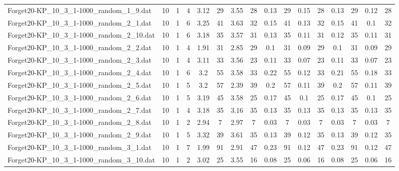 \begin{sidewaystable}[!ht]
{\begin{tabular}{lccccccccccccccc}
Forget20-KP\_10\_3\_1-1000\_random\_1\_9.dat & 10 & 1 & 4 & 3.12 & 29 & 3.55 & 28 & 0.13 & 29 & 0.15 & 28 & 0.13 & 29 &  \textcolor{blue2}{0.12} & 28 \\
Forget20-KP\_10\_3\_1-1000\_random\_2\_1.dat & 10 & 1 & 6 & 3.25 & 41 & 3.63 & 32 & 0.15 & 41 & 0.13 & 32 & 0.15 & 41 &  \textcolor{blue2}{0.1} & 32 \\
Forget20-KP\_10\_3\_1-1000\_random\_2\_10.dat & 10 & 1 & 6 & 3.18 & 35 & 3.57 & 31 & 0.13 & 35 &  \textcolor{blue2}{0.11} & 31 & 0.12 & 35 &  \textcolor{blue2}{0.11} & 31 \\
Forget20-KP\_10\_3\_1-1000\_random\_2\_2.dat & 10 & 1 & 4 & 1.91 & 31 & 2.85 & 29 & 0.1 & 31 &  \textcolor{blue2}{0.09} & 29 & 0.1 & 31 &  \textcolor{blue2}{0.09} & 29 \\
Forget20-KP\_10\_3\_1-1000\_random\_2\_3.dat & 10 & 1 & 4 & 3.11 & 33 & 3.56 & 23 & 0.11 & 33 &  \textcolor{blue2}{0.07} & 23 & 0.11 & 33 &  \textcolor{blue2}{0.07} & 23 \\
Forget20-KP\_10\_3\_1-1000\_random\_2\_4.dat & 10 & 1 & 6 & 3.2 & 55 & 3.58 & 33 & 0.22 & 55 &  \textcolor{blue2}{0.12} & 33 & 0.21 & 55 & 0.18 & 33 \\
Forget20-KP\_10\_3\_1-1000\_random\_2\_5.dat & 10 & 1 & 5 & 3.2 & 57 & 2.39 & 39 & 0.2 & 57 &  \textcolor{blue2}{0.11} & 39 & 0.2 & 57 &  \textcolor{blue2}{0.11} & 39 \\
Forget20-KP\_10\_3\_1-1000\_random\_2\_6.dat & 10 & 1 & 5 & 3.19 & 45 & 3.58 & 25 & 0.17 & 45 & 0.1 & 25 & 0.17 & 45 & 0.1 & 25 \\
Forget20-KP\_10\_3\_1-1000\_random\_2\_7.dat & 10 & 1 & 4 & 3.18 & 35 & 3.16 & 35 &  \textcolor{blue2}{0.13} & 35 &  \textcolor{blue2}{0.13} & 35 &  \textcolor{blue2}{0.13} & 35 &  \textcolor{blue2}{0.13} & 35 \\
Forget20-KP\_10\_3\_1-1000\_random\_2\_8.dat & 10 & 1 & 2 & 2.94 & 7 & 2.97 & 7 &  \textcolor{blue2}{0.03} & 7 &  \textcolor{blue2}{0.03} & 7 &  \textcolor{blue2}{0.03} & 7 &  \textcolor{blue2}{0.03} & 7 \\
Forget20-KP\_10\_3\_1-1000\_random\_2\_9.dat & 10 & 1 & 5 & 3.32 & 39 & 3.61 & 35 & 0.13 & 39 &  \textcolor{blue2}{0.12} & 35 & 0.13 & 39 &  \textcolor{blue2}{0.12} & 35 \\
Forget20-KP\_10\_3\_1-1000\_random\_3\_1.dat & 10 & 1 & 7 & 1.99 & 91 & 2.91 & 47 & 0.23 & 91 &  \textcolor{blue2}{0.12} & 47 & 0.23 & 91 &  \textcolor{blue2}{0.12} & 47 \\
Forget20-KP\_10\_3\_1-1000\_random\_3\_10.dat & 10 & 1 & 2 & 3.02 & 25 & 3.55 & 16 & 0.08 & 25 &  \textcolor{blue2}{0.06} & 16 & 0.08 & 25 &  \textcolor{blue2}{0.06} & 16 \\

\end{tabular}}
\end{sidewaystable}
